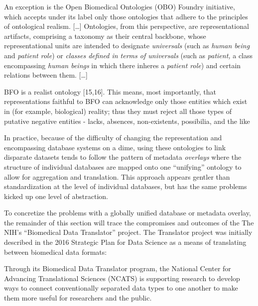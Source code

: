 \begin{leftbar}
An exception is the Open Biomedical Ontologies (OBO) Foundry initiative,
which accepts under its label only those ontologies that adhere to the
principles of ontological realism. {[}\ldots{]} Ontologies, from this
perspective, are representational artifacts, comprising a taxonomy as
their central backbone, whose representational units are intended to
designate \emph{universals} (such as \emph{human being} and
\emph{patient role}) or \emph{classes defined in terms of universals}
(such as \emph{patient,} a class encompassing \emph{human beings} in
which there inheres a \emph{patient role}) and certain relations between
them. {[}\ldots{]}

BFO is a realist ontology {[}15,16{]}. This means, most importantly,
that representations faithful to BFO can acknowledge only those entities
which exist in (for example, biological) reality; thus they must reject
all those types of putative negative entities - lacks, absences,
non-existents, possibilia, and the like \citep{ceustersFoundationsRealistOntology2010} 
\end{leftbar}

In practice, because of the difficulty of changing the representation
and encompassing database systems on a dime, using these ontologies to
link disparate datasets tends to follow the pattern of metadata
\emph{overlays} where the structure of individual databases are mapped
onto one ``unifying'' ontology to allow for aggregation and translation.
This approach appears gentler than standardization at the level of
individual databases, but has the same problems kicked up one level of
abstraction.

To concretize the problems with a globally unified database or metadata
overlay, the remainder of this section will trace the compromises and
outcomes of the The NIH's ``Biomedical Data Translator'' project. The
Translator project was initially described in the 2016 Strategic Plan
for Data Science as a means of translating between biomedical data
formats:

\begin{leftbar}
Through its Biomedical Data Translator program, the National Center for
Advancing Translational Sciences (NCATS) is supporting research to
develop ways to connect conventionally separated data types to one
another to make them more useful for researchers and the public. \citep{NIHStrategicPlan2018} 
\end{leftbar}


